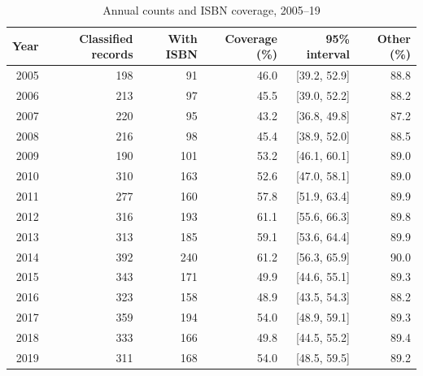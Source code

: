 \begin{table}[htbp]\centering\small
\caption{Annual counts and ISBN coverage, 2005--19}\label{tab:annual}
\begin{tabular}{rrrrrr}\toprule
Year & Classified records & With ISBN & Coverage (\%) & 95\% interval & Other (\%)\\\midrule
2005 & 198 & 91 & 46.0 & [39.2, 52.9] & 88.8\\
2006 & 213 & 97 & 45.5 & [39.0, 52.2] & 88.2\\
2007 & 220 & 95 & 43.2 & [36.8, 49.8] & 87.2\\
2008 & 216 & 98 & 45.4 & [38.9, 52.0] & 88.5\\
2009 & 190 & 101 & 53.2 & [46.1, 60.1] & 89.0\\
2010 & 310 & 163 & 52.6 & [47.0, 58.1] & 89.0\\
2011 & 277 & 160 & 57.8 & [51.9, 63.4] & 89.9\\
2012 & 316 & 193 & 61.1 & [55.6, 66.3] & 89.8\\
2013 & 313 & 185 & 59.1 & [53.6, 64.4] & 89.9\\
2014 & 392 & 240 & 61.2 & [56.3, 65.9] & 90.0\\
2015 & 343 & 171 & 49.9 & [44.6, 55.1] & 89.3\\
2016 & 323 & 158 & 48.9 & [43.5, 54.3] & 88.2\\
2017 & 359 & 194 & 54.0 & [48.9, 59.1] & 89.3\\
2018 & 333 & 166 & 49.8 & [44.5, 55.2] & 89.4\\
2019 & 311 & 168 & 54.0 & [48.5, 59.5] & 89.2\\
\bottomrule\end{tabular}
\end{table}
